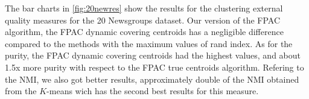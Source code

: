 \documentclass[runningheads]{llncs}
\begin{document}
The bar charts in \ref{fig:20newres} show the results for the
clustering external quality measures for the 20 Newsgroups dataset.
Our version of the FPAC algorithm, the FPAC dynamic covering centroids
has a negligible difference compared to the methods with the maximum values of rand index. As for the purity, the FPAC dynamic covering
centroids had the highest values, and about 1.5x more purity with respect to the FPAC true centroids algorithm. Refering to the
NMI, we also got better results, approximately double of the 
NMI obtained from the $K$-means wich has the second best results
for this measure.

\begin{figure}[H]
\centering
{}
\\

\end{figure}
\end{document}

